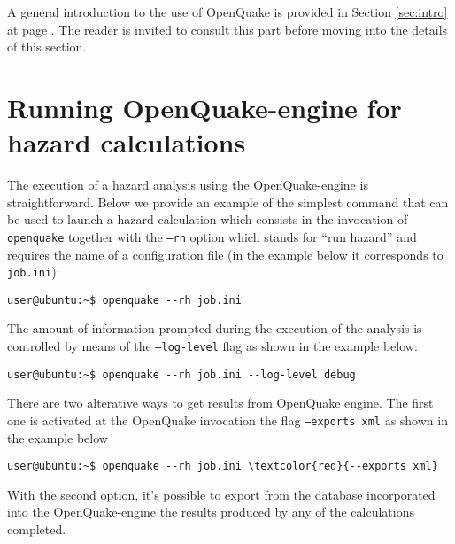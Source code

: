 A general introduction to the use of OpenQuake is provided in Section 
\ref{sec:intro} at page \pageref{sec:intro}.
The reader is invited to consult this part before moving into
the details of this section.

\section{Running OpenQuake-engine for hazard calculations}
The execution of a hazard analysis using the OpenQuake-engine 
is straightforward. Below we provide an example of the simplest 
command that can be used to launch a hazard calculation which 
consists in the invocation of \texttt{openquake} together with 
the \texttt{--rh} option which stands for ``run hazard'' and 
requires the name of a configuration file (in the example below
it corresponds to \texttt{job.ini}):
\begin{Verbatim}[frame=single, commandchars=\\\{\}, fontsize=\small]
user@ubuntu:~$ openquake --rh job.ini
\end{Verbatim}

The amount of information prompted during the execution of the 
analysis is controlled by means of the \texttt{--log-level} flag 
as shown in the example below:
\begin{Verbatim}[frame=single, commandchars=\\\{\}, fontsize=\small]
user@ubuntu:~$ openquake --rh job.ini --log-level debug
\end{Verbatim}

There are two alterative ways to get results from OpenQuake engine. 
The first one is activated at the OpenQuake invocation the flag 
\texttt{--exports xml} as shown in the example below
\begin{Verbatim}[frame=single, commandchars=\\\{\}, fontsize=\small]
user@ubuntu:~$ openquake --rh job.ini \textcolor{red}{--exports xml}
\end{Verbatim}

With the second option, it's possible to export from the database 
incorporated into the OpenQuake-engine the results produced by 
any of the calculations completed.

